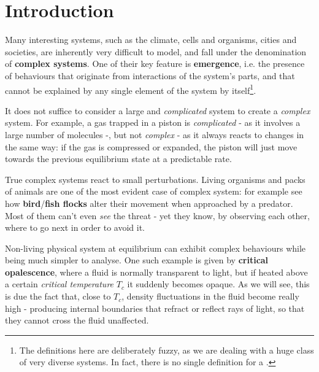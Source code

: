 \documentclass[../../main.tex]{subfiles}
\begin{document}
\section{Introduction}
Many interesting systems, such as the climate, cells and organisms, cities and societies, are inherently very difficult to model, and fall under the denomination of \textbf{complex systems}. 
One of their key feature is \textbf{emergence}, i.e. the presence of  behaviours that originate from interactions of the system's parts, and that cannot be explained by any single element of the system by itself\footnote{The definitions here are deliberately fuzzy, as we are dealing with a huge class of very diverse systems. In fact, there is no single  definition for a .}.

\medskip

It does not suffice to consider a large and \textit{complicated} system to create a \textit{complex} system. For example, a gas trapped in a piston is \textit{complicated} - as it involves a large number of molecules -, but not \textit{complex} - as it always reacts to changes in the same way: if the gas is compressed or expanded, the piston will just move towards the previous equilibrium state at a predictable rate.

\medskip

True complex systems react  to small perturbations. Living organisms and packs of animals are one of the most evident case of complex system: for example see how \textbf{bird}/\textbf{fish flocks} alter their movement when approached by a predator. Most of them can't even \textit{see} the threat - yet they know, by observing each other, where to go next in order to avoid it.

\medskip

Non-living physical system at equilibrium can exhibit complex behaviours while being much simpler to analyse. One such example is given by \textbf{critical opalescence}, where a fluid is normally transparent to light, but if heated above a certain \textit{critical temperature} $T_c$ it suddenly becomes opaque. As we will see, this is due the fact that, close to $T_c$, density fluctuations in the fluid become really high - producing internal boundaries that refract or reflect rays of light, so that they cannot cross the fluid unaffected.
\end{document}
